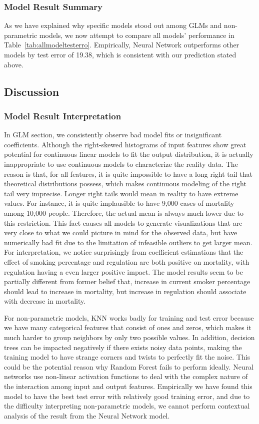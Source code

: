 \documentclass{article}
\begin{document}
\subsubsection{Model Result Summary}
As we have explained why specific models stood out among GLMs and non-parametric models, we now attempt to compare all models' performance in Table~\ref{tab:allmodeltesterro}. Empirically, Neural Network outperforms other models by test error of 19.38, which is consistent with our prediction stated above. 

\subsection{Discussion}
\subsubsection{Model Result Interpretation}

In GLM section, we consistently observe bad model fits or insignificant coefficients. Although the right-skewed histograms of input features show great potential for continuous linear models to fit the output distribution, it is actually inappropriate to use continuous models to characterize the reality data. The reason is that, for all features, it is quite impossible to have a long right tail that theoretical distributions possess, which makes continuous modeling of the right tail very imprecise. Longer right tails would mean in reality to have extreme values. For instance, it is quite implausible to have 9,000 cases of mortality among 10,000 people. Therefore, the actual mean is always much lower due to this restriction. This fact causes all models to generate visualizations that are very close to what we could picture in mind for the observed data, but have numerically bad fit due to the limitation of infeasible outliers to get larger mean. For interpretation, we notice surprisingly from coefficient estimations that the effect of smoking percentage and regulation are both positive on mortality, with regulation having a even larger positive impact. The model results seem to be partially different from former belief that, increase in current smoker percentage should lead to increase in mortality, but increase in regulation should associate with decrease in mortality. 

For non-parametric models, KNN works badly for training and test error because we have many categorical features that consist of ones and zeros, which makes it much harder to group neighbors by only two possible values. In addition, decision trees can be impacted negatively if there exists noisy data points, making the training model to have strange corners and twists to perfectly fit the noise. This could be the potential reason why Random Forest fails to perform ideally. Neural networks use non-linear activation functions to deal with the complex nature of the interaction among input and output features. Empirically we have found this model to have the best test error with relatively good training error, and due to the difficulty interpreting non-parametric models, we cannot perform contextual analysis of the result from the Neural Network model. 
\end{document}

